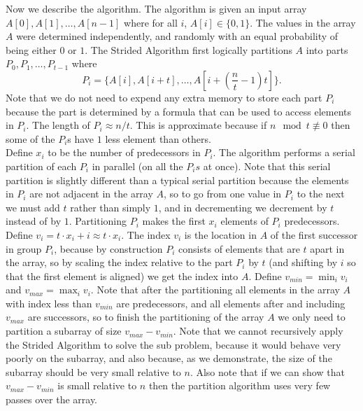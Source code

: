 \documentclass[twocolumn, twoside, 11pt]{article}
\renewcommand{\paragraph}[1]{\vspace{0.09in}\noindent{\bf \boldmath #1.}}
\begin{document}
\paragraph{Strided Algorithm Description}
Now we describe the algorithm.
The algorithm is given an input array $A[0],A[1],\ldots,A[n-1]$ where for all $i$, $A[i] \in \{0, 1\}$.
The values in the array $A$ were determined independently, and randomly with an equal probability of being either $0$ or $1$.
The Strided Algorithm first logically partitions $A$ into parts $P_0, P_1, \ldots, P_{t-1}$ where 
\begin{equation*}
	P_i = \{A[i], A[i+t], \ldots, A[i+(\frac{n}{t}-1)t]\}.
\end{equation*}
Note that we do not need to expend any extra memory to store each part $P_i$ because the part is determined by a formula that can be used to access elements in $P_i$.
The length of $P_i \approx n/t$. This is approximate because if $n \mod t \not\equiv 0$ then some of the $P_i$s have $1$ less element than others.\\
Define $x_i$ to be the number of predecessors in $P_i$.
The algorithm performs a serial partition of each $P_i$ in parallel (on all the $P_is$ at once).
Note that this serial partition is slightly different than a typical serial partition because the elements in $P_i$ are not adjacent in the array $A$, so to go from one value in $P_i$ to the next we must add $t$ rather than simply $1$, and in decrementing we decrement by $t$ instead of by $1$.
Partitioning $P_i$ makes the first $x_i$ elements of $P_i$ predecessors.
Define $v_i = t\cdot x_i+i \approx t\cdot x_i$.
The index $v_i$ is the location in $A$ of the first successor in group $P_i$, because by construction $P_i$ consists of elements that are $t$ apart in the array, so by scaling the index relative to the part $P_i$ by $t$ (and shifting by $i$ so that the first element is aligned) we get the index into $A$.
Define $v_{min} = \min_i{v_i}$ and $v_{max} = \max_i {v_i}$.
Note that after the partitioning all elements in the array $A$ with index less than $v_{min}$ are predecessors, and all elements after and including $v_{max}$ are successors, so to finish the partitioning of the array $A$ we only need to partition a subarray of size $v_{max}-v_{min}$.
Note that we cannot recursively apply the Strided Algorithm to solve the sub problem, because it would behave very poorly on the subarray, and also because, as we demonstrate, the size of the subarray should be very small relative to $n$.
Also note that if we can show that $v_{max} - v_{min}$ is small relative to $n$ then the partition algorithm uses very few passes over the array.
\end{document}
